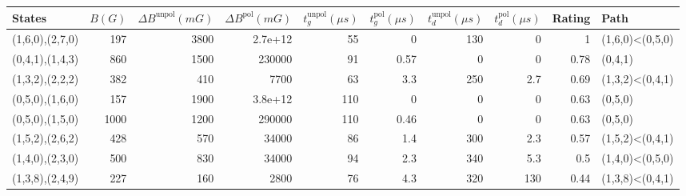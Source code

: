 \begin{tabular}{lrrrrrrrrl}
\hline
 {States}        &   {$B(G)$} &   {$\Delta B^{\text{unpol}}(mG)$} &   {$\Delta B^{\text{pol}}(mG)$} &   {$t^{\text{unpol}}_{g}(\mu s)$} &   {$t^{\text{pol}}_{g}(\mu s)$} &   {$t^{\text{unpol}}_{d}(\mu s)$} &   {$t^{\text{pol}}_{d}(\mu s)$} &   {Rating} & {Path}          \\
\hline
 (1,6,0),(2,7,0) &        197 &                              3800 &                         2.7e+12 &                                55 &                            0    &                               130 &                             0   &       1    & (1,6,0)<(0,5,0) \\
 (0,4,1),(1,4,3) &        860 &                              1500 &                    230000       &                                91 &                            0.57 &                                 0 &                             0   &       0.78 & (0,4,1)         \\
 (1,3,2),(2,2,2) &        382 &                               410 &                      7700       &                                63 &                            3.3  &                               250 &                             2.7 &       0.69 & (1,3,2)<(0,4,1) \\
 (0,5,0),(1,6,0) &        157 &                              1900 &                         3.8e+12 &                               110 &                            0    &                                 0 &                             0   &       0.63 & (0,5,0)         \\
 (0,5,0),(1,5,0) &       1000 &                              1200 &                    290000       &                               110 &                            0.46 &                                 0 &                             0   &       0.63 & (0,5,0)         \\
 (1,5,2),(2,6,2) &        428 &                               570 &                     34000       &                                86 &                            1.4  &                               300 &                             2.3 &       0.57 & (1,5,2)<(0,4,1) \\
 (1,4,0),(2,3,0) &        500 &                               830 &                     34000       &                                94 &                            2.3  &                               340 &                             5.3 &       0.5  & (1,4,0)<(0,5,0) \\
 (1,3,8),(2,4,9) &        227 &                               160 &                      2800       &                                76 &                            4.3  &                               320 &                           130   &       0.44 & (1,3,8)<(0,4,1) \\
\hline
\end{tabular}